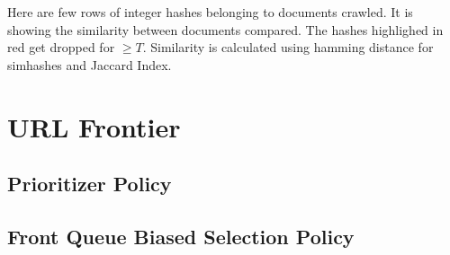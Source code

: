 \noindent
Here are few rows of integer hashes belonging to documents crawled. It is showing the similarity between
documents compared. The hashes highlighed in red get dropped for $\geq T$. Similarity is calculated using hamming distance for simhashes and Jaccard Index.
%
%

\pagebreak

\section{URL Frontier}
\subsection{Prioritizer Policy}
\subsection{Front Queue Biased Selection Policy}

\pagebreak